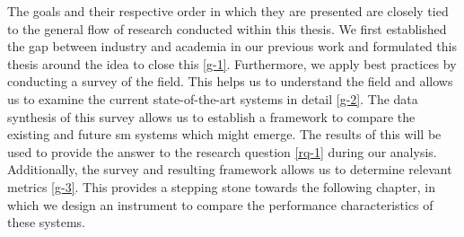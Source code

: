 The goals and their respective order in which they are  presented are closely tied to the general flow of research conducted within this thesis. We first established the gap between industry and academia in our previous work and formulated this thesis around the idea to close this \ref{g-1}. Furthermore, we apply best practices by conducting a survey of the field. This helps us to understand the field and allows us to examine the current state-of-the-art systems in detail \ref{g-2}. The data synthesis of this survey allows us to establish a framework to compare the existing and future \gls{sm} systems which might emerge. The results of this will be used to provide the answer to the research question \ref{rq-1} during our analysis. Additionally, the survey and resulting framework allows us to determine relevant metrics \ref{g-3}. This provides a stepping stone towards the following chapter, in which we design an instrument to compare the performance characteristics of these systems. 